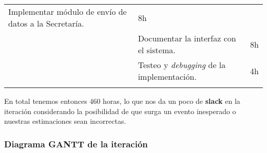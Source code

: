 \begin{longtable}[c]{@{}lll@{}}
\begin{minipage}[t]{0.62\columnwidth}
Implementar módulo de envío de datos a la Secretaría.
\end{minipage} & \begin{minipage}[t]{0.10\columnwidth}\raggedright
8h
\end{minipage}
\\\noalign{\medskip}
\begin{minipage}[t]{0.28\columnwidth}\raggedright
\end{minipage} & \begin{minipage}[t]{0.62\columnwidth}\raggedright
Documentar la interfaz con el sistema.
\end{minipage} & \begin{minipage}[t]{0.10\columnwidth}\raggedright
8h
\end{minipage}
\\\noalign{\medskip}
\begin{minipage}[t]{0.28\columnwidth}\raggedright
\end{minipage} & \begin{minipage}[t]{0.62\columnwidth}\raggedright
Testeo y \emph{debugging} de la implementación.
\end{minipage} & \begin{minipage}[t]{0.10\columnwidth}\raggedright
4h
\end{minipage}
\\\noalign{\medskip}
\hline
\end{longtable}

En total tenemos entonces 460 horas, lo que nos da un poco de
\textbf{slack} en la iteración considerando la posibilidad de que surga
un evento inesperado o nuestras estimaciones sean incorrectas.

\subsubsection{Diagrama GANTT de la iteración}
